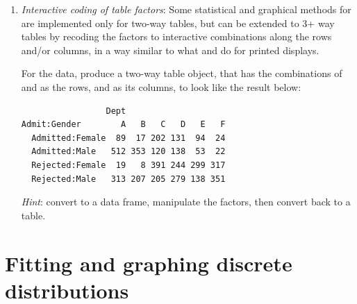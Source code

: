 \documentclass[11pt]{book}
\renewenvironment{knitrout}{\small\renewcommand{\baselinestretch}{.85}}{} %
\begin{document}
\begin{enumerate}
\item \emph{Interactive coding of table factors}:  Some statistical and graphical
\hard
methods for \ctabs are implemented only for two-way tables, but can be extended
to 3+ way tables by recoding the factors to interactive combinations along the
rows and/or columns, in a way similar to what  and 
do for printed displays.

For the  data, produce a two-way table object, 
that has the combinations of  and  as the rows, and
 as its columns, to look like the result below:
\begin{verbatim}
                 Dept
Admit:Gender        A   B   C   D   E   F
  Admitted:Female  89  17 202 131  94  24
  Admitted:Male   512 353 120 138  53  22
  Rejected:Female  19   8 391 244 299 317
  Rejected:Male   313 207 205 279 138 351
\end{verbatim}
\emph{Hint}: convert to a data frame, manipulate the factors, then convert back to
a table.
\end{enumerate}

\begin{knitrout}
\color{fgcolor}\begin{kframe}
\begin{alltt}
\hlopt{$} \hlkwb{<-} \hlstd{(}
\hlstd{(}\hlopt{$}\hlstd{ch02[}\hlopt{$}\hlstd{(}\hlstd{)\{}\hlopt{!}\hlstd{(}\hlstd{(n))\})])}
\end{alltt}
\end{kframe}
\end{knitrout}




\chapter{Fitting and graphing discrete distributions}\label{ch:discrete}

\end{document}
